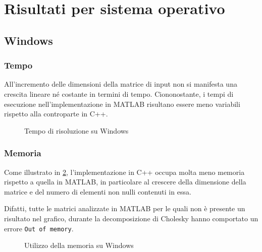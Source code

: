 \documentclass[11pt,italian]{article}
\begin{document}
\newpage
\section{Risultati per sistema operativo}
\label{section-results-impl}

\subsection{Windows}
\subsubsection*{Tempo}
All'incremento delle dimensioni della matrice di input non si manifesta una crescita lineare né costante in termini di tempo.
Ciononostante, i tempi di esecuzione nell'implementazione in MATLAB risultano essere meno variabili rispetto alla controparte in C++.
\begin{figure}[H]
    \caption{Tempo di risoluzione su Windows}
    \label{fig:windows-time}
\end{figure}

\smallskip
\subsubsection*{Memoria}
Come illustrato in \cref{fig:windows-memory}, l'implementazione in C++ occupa molta meno memoria rispetto a quella in MATLAB, in particolare al crescere della dimensione della matrice e del numero di elementi non nulli contenuti in essa.

Difatti, tutte le matrici analizzate in MATLAB per le quali non è presente un risultato nel grafico, durante la decomposizione di Cholesky hanno comportato un errore \lstinline{Out of memory}.
\begin{figure}[H]
    \caption{Utilizzo della memoria su Windows}
    \label{fig:windows-memory}
\end{figure}
\end{document}
